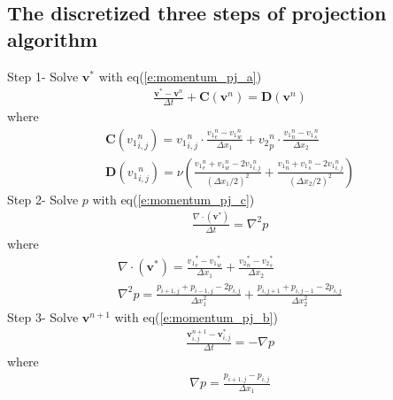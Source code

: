\documentclass[11pt,dvips]{article}
\numberwithin{equation}{section}
\begin{document}
\subsection{The discretized three steps of projection algorithm}
Step 1- Solve $\mathbf{v}^{*}$ with eq(\ref{e:momentum_pj_a})
%
\begin{align}
\frac{\mathbf{v}^{*}-\mathbf{v}^{n}}{\Delta t}+\mathbf{C}(\mathbf{v}^{n})=
\mathbf{D}(\mathbf{v}^{{n}})  \nonumber
\end{align}
%
where
%
\begin{gather}
\mathbf{C}({v_1}^n_{i,j})={v_1}^n_{i,j} \cdot \frac{{v_1}^n_{e}-{v_1}^n_{w}}{\Delta x_1}+{v_2}^n_{p} 
\cdot \frac{{v_1}^n_{n}-{v_1}^n_{s}}{\Delta x_2} \\
\mathbf{D}({v_1}^n_{i,j})=\nu (\frac{{v_1}^n_{e}+ {v_1}^n_{w}-2{v_1}^n_{i,j}}{(\Delta x_1/2)^2}
+\frac{{v_1}^n_{n}+ {v_1}^n_{s}-2{v_1}^n_{i,j}}{(\Delta x_2/2)^2})
\end{gather}
%
Step 2- Solve $p$ with eq(\ref{e:momentum_pj_c})
%
\begin{align}
\frac{\nabla \cdot(\mathbf{v}^{*})}{\Delta t}=\nabla ^2 p \nonumber
\end{align}
%
where
%
\begin{gather}
\nabla \cdot(\mathbf{v}^{*})=\frac{{v_1}^{*}_{e}-{v_1}^{*}_{w}}{\Delta x_1}
+\frac{{v_2}^{*}_{n}-{v_2}^{*}_{s}}{\Delta x_2} \\
\nabla ^2 p=\frac{p_{i+1,j}+p_{i-1,j}-2p_{i,j}}{\Delta x_1^2}+\frac{p_{i,j+1}
+p_{i,j-1}-2p_{i,j}}{\Delta x_2^2}
\end{gather}
%
Step 3- Solve $\mathbf{v}^{n+1}$ with eq(\ref{e:momentum_pj_b})
%
\begin{align}
\frac{\mathbf{v}^{n+1}_{i,j}-\mathbf{v}^{*}_{i,j}}{\Delta t}=-\nabla p \nonumber
\end{align}
%
where
%
\begin{align}
\nabla p=\frac{p_{i+1,j}-p_{i,j}}{\Delta x_1}
\end{align}

\clearpage


\end{document}
